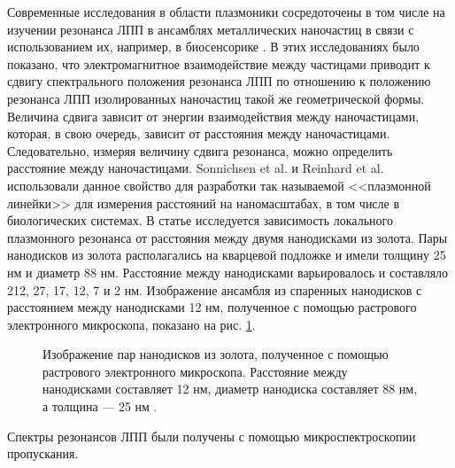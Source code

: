 Современные исследования в области плазмоники сосредоточены в том числе на изучении резонанса ЛПП в ансамблях металлических наночастиц в связи с использованием их, например, в биосенсорике \cite{biosensing}. В этих исследованиях было показано, что электромагнитное взаимодействие между частицами приводит к сдвигу спектрального положения резонанса ЛПП по отношению к положению резонанса ЛПП изолированных наночастиц такой же геометрической формы.
Величина сдвига зависит от энергии взаимодействия между наночастицами, которая, в свою очередь, зависит от расстояния между наночастицами. Следовательно, измеряя величину сдвига резонанса, можно определить расстояние между наночастицами. Sonnichsen et al. \cite{bioplasmonruler} и Reinhard et al. \cite{bioplasmonruler2} использовали данное свойство для разработки так называемой  <<плазмонной линейки>> для измерения расстояний на наномасштабах, в том числе в биологических системах.  В статье \cite{plasonrulereq} исследуется зависимость локального плазмонного резонанса от расстояния между двумя нанодисками из золота. Пары нанодисков из золота располагались на кварцевой подложке и имели толщину 25 нм и диаметр 88 нм. Расстояние между нанодисками варьировалось и составляло 212, 27, 17, 12, 7 и 2 нм. Изображение ансамбля из спаренных нанодисков с расстоянием между нанодисками 12 нм, полученное с помощью растрового электронного микроскопа, показано на рис. \ref{img:PR_SEM}.
\begin{figure}
\caption{Изображение пар нанодисков из золота, полученное с помощью растрового электронного микроскопа. Расстояние между нанодисками составляет 12 нм, диаметр нанодиска составляет 88 нм, а толщина --- 25 нм \cite{plasonrulereq}.}
\label{img:PR_SEM}
\end{figure}
Спектры резонансов ЛПП были получены с помощью микроспектроскопии пропускания. %
